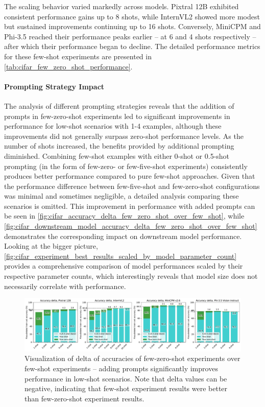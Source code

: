 \documentclass[../ShajiS_RnDReport.tex]{subfiles}
\begin{document}
The scaling behavior varied markedly across models. Pixtral 12B exhibited consistent performance gains up to 8 shots, while InternVL2 showed more modest but sustained improvements continuing up to 16 shots. Conversely, MiniCPM and Phi-3.5 reached their performance peaks earlier -- at 6 and 4 shots respectively -- after which their performance began to decline. The detailed performance metrics for these few-shot experiments are presented in \autoref{tab:cifar_few_zero_shot_performance}.



\paragraph*{Prompting Strategy Impact}
The analysis of different prompting strategies reveals that the addition of prompts in few-zero-shot experiments led to significant improvements in performance for low-shot scenarios with 1-4 examples, although these improvements did not generally surpass zero-shot performance levels. As the number of shots increased, the benefits provided by additional prompting diminished. Combining few-shot examples with either 0-shot or 0.5-shot prompting (in the form of few-zero- or few-five-shot experiments) consistently produces better performance compared to pure few-shot approaches. Given that the performance difference between few-five-shot and few-zero-shot configurations was minimal and sometimes negligible, a detailed analysis comparing these scenarios is omitted. This improvement in performance with added prompts can be seen in \autoref{fig:cifar_accuracy_delta_few_zero_shot_over_few_shot}, while \autoref{fig:cifar_downstream_model_accuracy_delta_few_zero_shot_over_few_shot} demonstrates the corresponding impact on downstream model performance. Looking at the bigger picture, \autoref{fig:cifar_experiment_best_results_scaled_by_model_parameter_count} provides a comprehensive comparison of model performances scaled by their respective parameter counts, which interestingly reveals that model size does not necessarily correlate with performance.

\begin{figure}[ht]
    \centering
    \includegraphics[width=\linewidth]{figures/cifar_accuracy_delta_few_zero_shot_over_few_shot.pdf}
    \caption{Visualization of delta of accuracies of few-zero-shot experiments over few-shot experiments -- adding prompts significantly improves performance in low-shot scenarios. Note that delta values can be negative, indicating that few-shot experiment results were better than few-zero-shot experiment results.}
    \label{fig:cifar_accuracy_delta_few_zero_shot_over_few_shot}
\end{figure}
\end{document}
